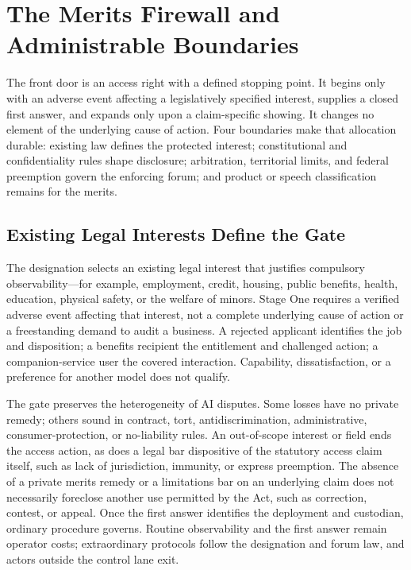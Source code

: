 \section{The Merits Firewall and Administrable Boundaries}
\label{sec:objections}

The front door is an access right with a defined stopping point. It begins only with an adverse event affecting a legislatively specified interest, supplies a closed first answer, and expands only upon a claim-specific showing. It changes no element of the underlying cause of action. Four boundaries make that allocation durable: existing law defines the protected interest; constitutional and confidentiality rules shape disclosure; arbitration, territorial limits, and federal preemption govern the enforcing forum; and product or speech classification remains for the merits.

\subsection{Existing Legal Interests Define the Gate}

The designation selects an existing legal interest that justifies compulsory observability---for example, employment, credit, housing, public benefits, health, education, physical safety, or the welfare of minors. Stage One requires a verified adverse event affecting that interest, not a complete underlying cause of action or a freestanding demand to audit a business. A rejected applicant identifies the job and disposition; a benefits recipient the entitlement and challenged action; a companion-service user the covered interaction. Capability, dissatisfaction, or a preference for another model does not qualify.

The gate preserves the heterogeneity of AI disputes. Some losses have no private remedy; others sound in contract, tort, antidiscrimination, administrative, consumer-protection, or no-liability rules. An out-of-scope interest or field ends the access action, as does a legal bar dispositive of the statutory access claim itself, such as lack of jurisdiction, immunity, or express preemption. The absence of a private merits remedy or a limitations bar on an underlying claim does not necessarily foreclose another use permitted by the Act, such as correction, contest, or appeal. Once the first answer identifies the deployment and custodian, ordinary procedure governs. Routine observability and the first answer remain operator costs; extraordinary protocols follow the designation and forum law, and actors outside the control lane exit.

